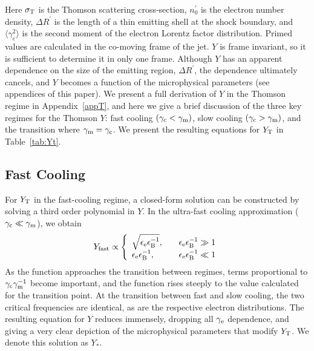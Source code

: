 \documentclass[fleqn,usenatbib]{mnras}
\begin{document}
Here $\sigma_{\rm T}$ is the Thomson scattering cross-section, $n_0^{\prime}$ is the electron number density, $\Delta R^{\prime}$ is the length of a thin emitting shell at the shock boundary, and $\langle \gamma_{e}^2\rangle$ is the second moment of the electron Lorentz factor distribution. Primed values are calculated in the co-moving frame of the jet. $Y$ is frame invariant, so it is sufficient to determine it in only one frame. Although $Y$ has an apparent dependence on the size of the emitting region, $\Delta R^{\prime}$, the dependence ultimately cancels, and $Y$ becomes a function of the microphysical parameters (see appendices of this paper).  We present a full derivation of $Y$ in the Thomson regime in Appendix~\ref{appT}, and here we give a brief discussion of the three key regimes for the Thomson $Y$: fast cooling $(\gamma_{\rm c}<\gamma_{\rm m})$, slow cooling $(\gamma_{\rm c}>\gamma_{\rm m})$, and the transition where $\gamma_{\rm m} = \gamma_{\rm c}$. We present the resulting equations for $Y_{\rm T}$ in Table~\ref{tab:Yt}. 


\subsection{Fast Cooling}
For $Y_{\rm T}$ in the fast-cooling regime, a closed-form solution can be constructed by solving a third order polynomial in $Y$. In the ultra-fast cooling approximation ($\gamma_{\rm c} \ll \gamma_{\rm m}$), we obtain 
\begin{equation}
Y_{\text{fast}}\propto \left\{
        \begin{array}{ll}
            \sqrt{\epsilon_{\rm e}\epsilon_{\rm B}^{-1}}, & \quad \epsilon_{\rm e}\epsilon_{\rm B}^{-1} \gg 1  \\
            \epsilon_{\rm e}\epsilon_{\rm B}^{-1}, & \quad \epsilon_{\rm e}\epsilon_{\rm B}^{-1} \ll 1
        \end{array}
    \right.
\end{equation}
As the function approaches the transition between regimes, terms proportional to $\gamma_{\rm c}\gamma_{\rm m}^{-1}$ become important, and the function rises steeply to the value calculated for the transition point. At the transition between fast and slow cooling, the two critical frequencies are identical, as are the respective electron distributions. The resulting equation for $Y$ reduces immensely, dropping all $\gamma_{\rm e}$ dependence, and giving a very clear depiction of the microphysical parameters that modify $Y_{\rm T}$. We denote this solution as $Y_{*}$.
\end{document}

